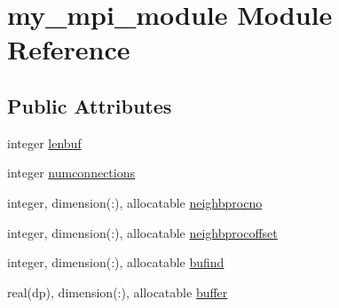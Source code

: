 \hypertarget{classmy__mpi__module}{\section{my\-\_\-mpi\-\_\-module Module Reference}
\label{classmy__mpi__module}
}
\subsection*{Public Attributes}
\begin{DoxyCompactItemize}
\item 
integer \hyperlink{classmy__mpi__module_a82789d56a363b94cd7f592ceefb6ad0c}{lenbuf}
\item 
integer \hyperlink{classmy__mpi__module_a077353bce0dd655d563893b0c5f1f824}{numconnections}
\item 
integer, dimension(\-:), allocatable \hyperlink{classmy__mpi__module_af8e0702b35db91cc77e087d3343abbf2}{neighbprocno}
\item 
integer, dimension(\-:), allocatable \hyperlink{classmy__mpi__module_ac50725ae6d52207dc965ada7e693ad7c}{neighbprocoffset}
\item 
integer, dimension(\-:), allocatable \hyperlink{classmy__mpi__module_a5ece5549dad644d94619ce1566b5bbba}{bufind}
\item 
real(dp), dimension(\-:), allocatable \hyperlink{classmy__mpi__module_a04f467db36199e98b0dfc5c72a2f993d}{buffer}
\end{DoxyCompactItemize}



